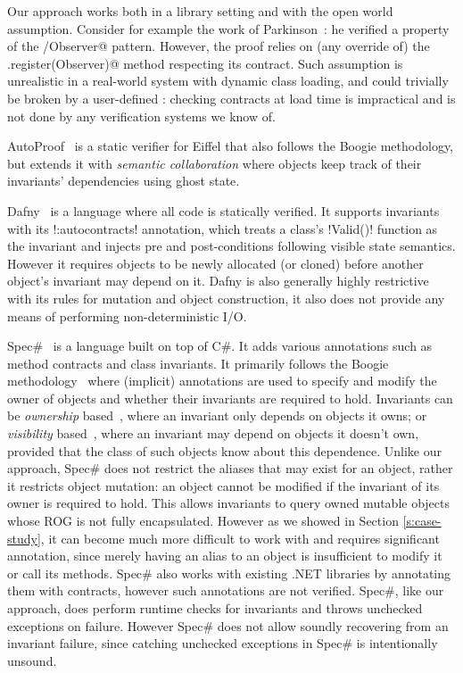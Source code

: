 Our approach works both  in a library setting and with the open world assumption.
Consider for example the work of Parkinson~\cite{parkinson2007class}: he verified a property of the \Q@Subject/Observer@ pattern. However, the proof relies on (any override of) the \Q@Subject.register(Observer)@ method respecting its contract. Such assumption is unrealistic in a real-world system with dynamic class loading, and could trivially be broken by a user-defined \Q@EvilSubject@: checking contracts at load time is impractical and is not done by any verification systems we know of.

AutoProof~\cite{DBLP:conf/fm/PolikarpovaTFM14} is a static verifier for Eiffel that also follows the Boogie methodology, but extends it with \emph{semantic collaboration} where objects keep track of their invariants' dependencies using ghost state.

Dafny~\cite{DBLP:conf/sigada/Leino12} is a language where all code is statically verified. It supports invariants with its \Q!{:autocontracts}! annotation, which treats a class's \Q!Valid()! function as the invariant and injects pre and post-conditions following visible state semantics.
However it requires objects to be newly allocated (or cloned) before another object's invariant may depend on it.
Dafny is also generally highly restrictive with its rules for mutation and object construction, it also does not provide any means of performing 
non-deterministic I/O.

Spec\#~\cite{Barnett:2004:SPS:2131546.2131549} is a language built on top of C\#. It adds various annotations such as method contracts and class invariants. 
It primarily follows the Boogie methodology~\cite{DBLP:journals/tcs/NaumannB06} where (implicit) annotations are used to specify and modify the owner of objects and whether their invariants are required to hold. Invariants can be \emph{ownership} based~\cite{DBLP:journals/jot/BarnettDFLS04}, where an invariant only depends on objects it owns; or \emph{visibility} based~\cite{DBLP:conf/mpc/BarnettN04,DBLP:conf/ecoop/LeinoM04}, where an invariant may depend on objects it doesn't own, provided that the class of such objects know about this dependence. Unlike our approach, Spec\# does not restrict the aliases that may exist for an object, rather it restricts object mutation: an object cannot be modified if the invariant of its owner is required to hold. This 
allows invariants to query owned mutable objects whose ROG is not fully encapsulated. However as we showed in Section \ref{s:case-study}, it can become much more difficult to work with and requires significant annotation, since merely having an alias to an object
is insufficient to modify it or call its methods.
Spec\# also works with existing .NET libraries by annotating them with contracts, however such annotations are not verified. Spec\#, like our approach, does perform runtime checks for invariants and throws unchecked exceptions on failure.  However Spec\# does not allow soundly recovering from an invariant failure, since catching unchecked exceptions in Spec\# is intentionally unsound.~\cite{Leino2004ExceptionSF}




